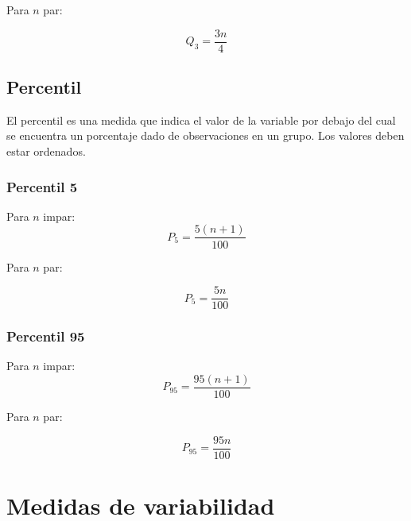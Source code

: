 \documentclass{report}
\begin{document}
            Para $n$ par:

            \begin{equation*}
              Q_3=\frac{3n}{4}
            \end{equation*} 

        \subsection*{Percentil}
          El percentil es una medida que indica el valor de la variable por debajo 
          del cual se encuentra un porcentaje dado de observaciones en un grupo.
          Los valores deben estar ordenados.

          \subsubsection*{Percentil 5}

            \indent Para $n$ impar:
            \begin{equation*}
              P_5=\frac{5(n+1)}{100}
            \end{equation*}

            Para $n$ par:

            \begin{equation*}
              P_5=\frac{5n}{100}
            \end{equation*}

          \subsubsection*{Percentil 95}

            \indent Para $n$ impar:
            \begin{equation*}
              P_95=\frac{95(n+1)}{100}
            \end{equation*}

            Para $n$ par:

            \begin{equation*}
              P_95=\frac{95n}{100}
            \end{equation*}

    \section*{Medidas de variabilidad}
      
\end{document}
